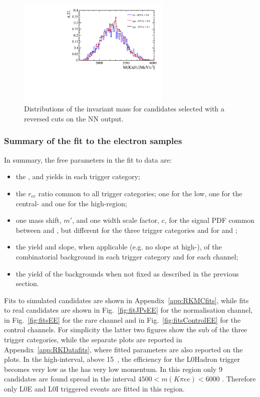 \begin{figure}[t!]
\vspace{1cm}

\centering
\includegraphics[width=0.65\textwidth]{RKst/figs/Background/highq2_comb.pdf}
\caption{Distributions of the \mKpill invariant mass for \BdToKstll candidates selected with a reversed cuts on the NN output.}
\label{fig:highq2_comb}
\end{figure}


\subsubsection{Summary of the fit to the electron samples}

In summary, the free parameters in the fit to data are:
%
\begin{itemize}
\item the \BdToKstJPsee, \BdToKstPsiee and \BdToKstGee yields in each trigger category;
\item the $r_{ee}$ ratio common to all trigger categories; one for the low, one for the central- and one for the high-\qsq region;
\item one mass shift, $m'$, and one width scale factor, $c$, for the signal PDF common between \BdToKstJPsee and \BdToKstee,
but different for the three trigger categories and for \BdToKstPsiee and \BdToKstGee;
\item the yield and slope, when applicable (e.g. no slope at high-\qsq), of the combinatorial background in each trigger category and for each channel;
\item the yield of the backgrounds when not fixed as described in the previous section.
\end{itemize}

Fits to simulated \BdToKstJPsee candidates are shown in Appendix~\ref{app:RKMCfits}, while
fits to real candidates are shown in Fig.~\ref{fig:fitJPsEE} for the normalisation channel, in Fig.~\ref{fig:fitsEE} 
for the rare channel and in Fig.~\ref{fig:fitsControlEE} for the control channels.
For simplicity the latter two figures show the sub of the three trigger categories, while the separate plots are
reported in Appendix~\ref{app:RKDatafits}, where fitted parameters are also reported on the plots.
%
In the high-\qsq interval, above 15~\gevgevcccc, the efficiency for the
L0Hadron trigger becomes very low as the \Kstar has very low momentum.
In this region only 9 candidates are found spread in the interval
$4500 < m(K\pi ee) < 6000$ \mevcc. Therefore
only L0E and L0I triggered events are fitted in this region.


